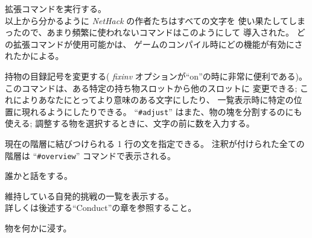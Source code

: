\item[\tb{\#}]
拡張コマンドを実行する。\\
以上から分かるように {\it NetHack\/} の作者たちはすべての文字を
使い果たしてしまったので、あまり頻繁に使われないコマンドはこのようにして
導入された。
どの拡張コマンドが使用可能かは、
ゲームのコンパイル時にどの機能が有効にされたかによる。
\item[\tb{\#adjust}]
持物の目録記号を変更する(
{\it fixinv\/}
オプションが``on''の時に非常に便利である)。\\
このコマンドは、ある特定の持ち物スロットから他のスロットに
変更できる; これによりあなたにとってより意味のある文字にしたり、
一覧表示時に特定の位置に現れるようにしたりできる。
``{\tt \#adjust}'' はまた、物の塊を分割するのにも使える;
調整する物を選択するときに、文字の前に数を入力する。
\item[\tb{\#annotate}]
現在の階層に結びつけられる 1 行の文を指定できる。
注釈が付けられた全ての階層は
``{\tt \#overview}'' コマンドで表示される。
\item[\tb{\#chat}]
誰かと話をする。
\item[\tb{\#conduct}]
維持している自発的挑戦の一覧を表示する。\\
詳しくは後述する``Conduct''の章を参照すること。
\item[\tb{\#dip}]
物を何かに浸す。
\item[\tb{\#enhance}]
